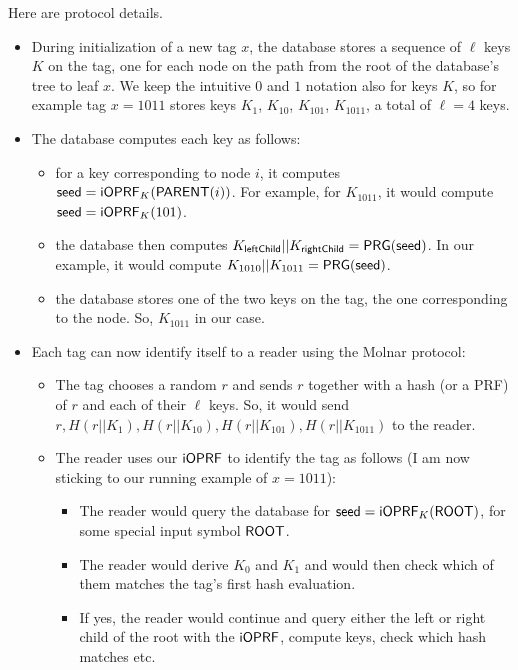 \documentclass{article}
\begin{document}
Here are protocol details.
\begin{itemize}

\item During initialization of a new tag $x$, the database stores a
  sequence of $\ell$ keys $K$ on the tag, one for each node on the path from
  the root of the database's tree to leaf $x$. We keep the intuitive $0$
  and $1$ notation also for keys $K$, so for example tag $x = 1011$ stores
  keys $K_1$, $K_{10}$, $K_{101}$, $K_{1011}$, a total of $\ell=4$ keys.

\item The database computes each key as follows:  
\begin{itemize}
\item for a key corresponding to node $i$, it computes $\mathsf{seed} =
  \mathsf{i}\mathsf{OPRF}_K(\mathsf{PARENT}(i))$. For example, for $K_{1011}$, it would
  compute $\mathsf{seed} = \mathsf{i}\mathsf{OPRF}_K(101)$.

\item the database then computes
  $K_{\mathsf{leftChild}}||K_{\mathsf{rightChild}} = \mathsf{PRG}(\mathsf{seed})$. In
  our example, it would compute $K_{1010}||K_{1011} = \mathsf{PRG}(\mathsf{seed})$.

\item the database stores one of the two keys on the tag, the one corresponding to the node. So, $K_{1011}$ in our case.
\end{itemize}

\item Each tag can now identify itself to a reader using the Molnar protocol:

  \begin{itemize}
\item The tag chooses a random $r$ and sends $r$ together with a hash (or a PRF) of $r$ and each of their $\ell$ keys. So, it would send $r, H(r||K_1), H(r||K_{10}), H(r||K_{101}), H(r||K_{1011})$ to the reader.

\item The reader uses our $\mathsf{i}\mathsf{OPRF}$ to identify the tag as follows (I am now sticking to our running example of $x=1011$):
  \begin{itemize}
    
\item The reader would query the database for $\mathsf{seed} =
  \mathsf{i}\mathsf{OPRF}_K(\mathsf{ROOT})$, for some special input symbol $\mathsf{ROOT}$.

\item The reader would derive $K_0$ and $K_1$ and would then check which of them matches the tag's first hash evaluation. 

\item If yes, the reader would continue and query either the left or right child of the root with the $\mathsf{i}\mathsf{OPRF}$, compute keys, check which hash matches etc.
\end{itemize}
  \end{itemize}
\end{itemize}
\end{document}
